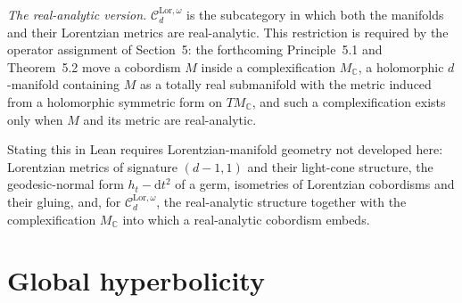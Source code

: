 \begin{definition}
  \emph{The real-analytic version.} $\mathcal C_d^{\mathrm{Lor},\omega}$ is the
  subcategory in which both the manifolds and their Lorentzian metrics are
  real-analytic. This restriction is required by the operator assignment of
  Section~5: the forthcoming Principle~5.1 and Theorem~5.2 move a cobordism $M$
  inside a complexification $M_{\mathbb C}$, a holomorphic $d$-manifold
  containing $M$ as a totally real submanifold with the metric induced from a
  holomorphic symmetric form on $TM_{\mathbb C}$, and such a complexification
  exists only when $M$ and its metric are real-analytic.

  Stating this in Lean requires Lorentzian-manifold geometry not developed here:
  Lorentzian metrics of signature $(d-1,1)$ and their light-cone structure, the
  geodesic-normal form $h_t - \mathrm{d}t^2$ of a germ, isometries of Lorentzian
  cobordisms and their gluing, and, for $\mathcal C_d^{\mathrm{Lor},\omega}$, the
  real-analytic structure together with the complexification $M_{\mathbb C}$ into
  which a real-analytic cobordism embeds.
\end{definition}

\section{Global hyperbolicity}

